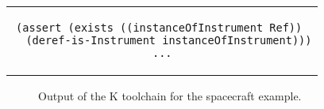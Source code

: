 
\begin{center}
\begin{tabular}{c}
\begin{lstlisting}
(assert (exists ((instanceOfInstrument Ref)) 
  (deref-is-Instrument instanceOfInstrument)))
...
\end{lstlisting}
\end{tabular}
\end{center}


\begin{figure}
\caption{Output of the K toolchain for the spacecraft example.}
\label{fig:shapes}
\end{figure}

\lstset{language=K}
